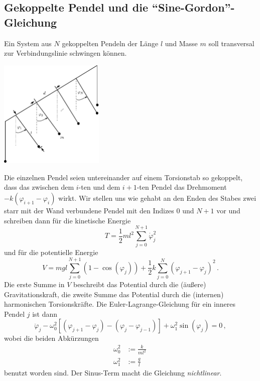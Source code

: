 \documentclass[paper=a4, fontsize=11.0pt, abstractoff, DIV12]{scrartcl}
\begin{document}
\subsection{Gekoppelte Pendel und die ``Sine-Gordon''-Gleichung}

Ein System aus $N$ gekoppelten Pendeln der Länge $l$ und Masse $m$ soll
transversal zur Verbindungslinie schwingen können.
\begin{center}
    \includegraphics[width=0.375\textwidth]{Pendel.pdf}
\end{center}
Die einzelnen Pendel seien untereinander auf einem Torsionstab so gekoppelt,
dass das zwischen dem $i$-ten und dem $i+1$-ten Pendel das Drehmoment
$-k(\varphi_{i+1} - \varphi_i)$ wirkt. Wir stellen uns wie gehabt an den
Enden des Stabes zwei starr mit der Wand verbundene Pendel mit den Indizes
$0$ und $N+1$ vor und schreiben dann für die kinetische Energie
\begin{equation}
T = \frac{1}{2}ml^2\sum\limits_{j=0}^{N+1}\dot\varphi_j^2
\end{equation}
und für die potentielle Energie
\begin{equation}
V = mgl\sum\limits_{j=0}^{N+1}(1-\cos(\varphi_j)) + \frac{1}{2}k\sum\limits_{j=0}^{N}\left(\varphi_{j+1} - \varphi_j\right)^2\,.
\end{equation}
Die erste Summe in $V$ beschreibt das Potential durch die (äußere)
Gravitationskraft, die zweite Summe das Potential durch die (internen)
harmonischen Torsionskräfte. Die Euler-Lagrange-Gleichung für ein inneres
Pendel $j$ ist dann
\begin{equation}
\ddot\varphi_{j} - \omega_0^2\left[(\varphi_{j+1} - \varphi_{j}) - (\varphi_{j}-\varphi_{j-1})\right] + \omega_1^2\sin(\varphi_j) = 0\,,
\end{equation}
wobei die beiden Abkürzungen
\begin{align}
\omega_0^2 &:= \frac{k}{ml^2}\nonumber\,\\
\omega_1^2 &:= \frac{g}{l}\nonumber
\end{align}
benutzt worden sind. Der Sinus-Term macht die Gleichung \emph{nichtlinear}.
\end{document}
